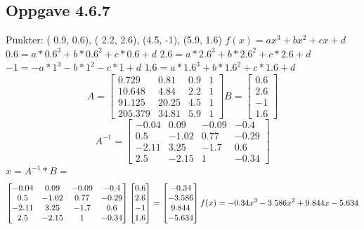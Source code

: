 \documentclass[a4paper,norsk]{article}
\begin{document}
\subsection{Oppgave 4.6.7}
Punkter: ( 0.9, 0.6), ( 2.2, 2.6), (4.5, -1), (5.9, 1.6) 
\newline
$f(x) = ax^{3} + bx^{2} + cx + d$\newline
$0.6 = a*0.6^{3} + b*0.6^{2} + c*0.6 + d$\newline
$2.6 = a*2.6^{3} + b*2.6^{2} + c*2.6 + d$\newline
$-1 = -a*1^{3} - b*1^{2} - c*1 + d$\newline
$1.6 = a*1.6^{3} + b*1.6^{2} + c*1.6 + d$\newline
\begin{equation*}
A = \begin{bmatrix} 0.729  & 0.81 & 0.9 & 1 \\ 10.648 & 4.84 & 2.2 & 1 \\ 
91.125 & 20.25 & 4.5 & 1 \\  205.379 & 34.81  & 5.9 & 1\end{bmatrix} B = \begin{bmatrix} 0.6 \\ 2.6 \\ -1 \\ 1.6\end{bmatrix}\end{equation*}
\newline
\begin{equation*}
A^{-1} = \begin{bmatrix} -0.04  & 0.09 & -0.09 & -0.4 \\ 0.5 & -1.02 & 0.77 & -0.29 \\ 
-2.11 & 3.25 & -1.7 & 0.6 \\  2.5 & -2.15  & 1 & -0.34 \end{bmatrix}
\end{equation*}
\newline
$x = A^{-1}*B = $
\begin{equation*}
\begin{bmatrix}  -0.04  & 0.09 & -0.09 & -0.4 \\ 0.5 & -1.02 & 0.77 & -0.29 \\ 
-2.11 & 3.25 & -1.7 & 0.6 \\  2.5 & -2.15  & 1 & -0.34  \end{bmatrix} \begin{bmatrix}  0.6 \\ 2.6 \\ -1 \\ 1.6\end{bmatrix}
= \begin{bmatrix} -0.34 \\ - 3.586 \\ 9.844 \\  -5.634 \end{bmatrix}
\newline
f(x) = -0.34x^{3} - 3.586x^{2}+9.844x - 5.634
\end{equation*}
\end{document}
